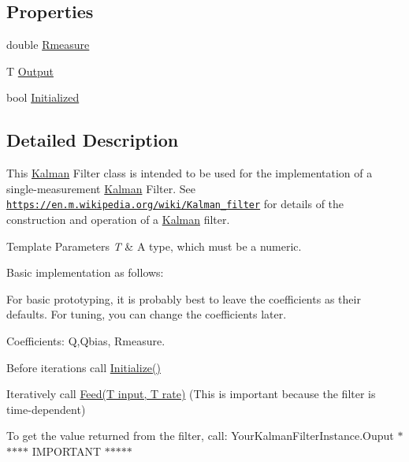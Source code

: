 \subsection*{Properties}
\begin{DoxyCompactItemize}
\item 
double \hyperlink{class_robotics_library_1_1_filters_1_1_kalman_abb21b31283beac465da9fe1c947a52cf}{Rmeasure}
\item 
T \hyperlink{class_robotics_library_1_1_filters_1_1_kalman_af2e026fe76f5a30e8da58dcc654ec26d}{Output}
\item 
bool \hyperlink{class_robotics_library_1_1_filters_1_1_kalman_a3c9aa0e2650a8085161821e858e64bb9}{Initialized}
\end{DoxyCompactItemize}


\subsection{Detailed Description}
This \hyperlink{class_robotics_library_1_1_filters_1_1_kalman}{Kalman} Filter class is intended to be used for the implementation of a single-\/measurement \hyperlink{class_robotics_library_1_1_filters_1_1_kalman}{Kalman} Filter. See \href{https://en.m.wikipedia.org/wiki/Kalman_filter}{\tt https\+://en.\+m.\+wikipedia.\+org/wiki/\+Kalman\+\_\+filter} for details of the construction and operation of a \hyperlink{class_robotics_library_1_1_filters_1_1_kalman}{Kalman} filter.


\begin{DoxyTemplParams}{Template Parameters}
{\em T} & A type, which must be a numeric.\\
\hline
\end{DoxyTemplParams}


Basic implementation as follows\+:

For basic prototyping, it is probably best to leave the coefficients as their defaults. For tuning, you can change the coefficients later.

Coefficients\+: {\ttfamily  Q,}{\ttfamily  Qbias, }{\ttfamily  Rmeasure}.


\begin{DoxyItemize}
\item Before iterations call {\ttfamily \hyperlink{class_robotics_library_1_1_filters_1_1_kalman_aec1fb77c692d3d444d1cbd60f2b2592c}{Initialize()}}
\item Iteratively call {\ttfamily  \hyperlink{class_robotics_library_1_1_filters_1_1_kalman_a5c2f27a6d48ede3369d4b9ac776954db}{Feed(\+T input, T rate)}} (This is important because the filter is time-\/dependent)
\item To get the value returned from the filter, call\+: {\ttfamily  Your\+Kalman\+Filter\+Instance.\+Ouput } $\ast$$\ast$$\ast$$\ast$$\ast$ I\+M\+P\+O\+R\+T\+A\+NT $\ast$$\ast$$\ast$$\ast$$\ast$
\end{DoxyItemize}

